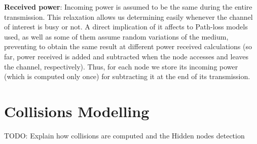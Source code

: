 \documentclass[a4paper]{article}
\begin{document}
\textbf{Received power}: Incoming power is assumed to be the same during the entire transmission. This relaxation allows us determining easily whenever the channel of interest is busy or not. A direct implication of it affects to Path-loss models used, as well as some of them assume random variations of the medium, preventing to obtain the same result at different power received calculations (so far, power received is added and subtracted when the node accesses and leaves the channel, respectively). Thus, for each node we store its incoming power (which is computed only once) for subtracting it at the end of its transmission. 



\section{Collisions Modelling}
TODO: Explain how collisions are computed and the Hidden nodes detection
\end{document}
